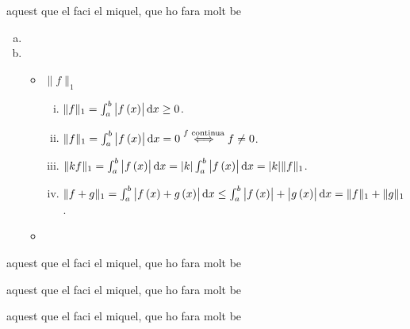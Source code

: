\begin{eje}
aquest que el faci el miquel, que ho fara molt be
\end{eje}

\begin{eje}
    \begin{enumerate}[(a)]
        \item[]
        \item
            \begin{itemize}
                \item $\| f \|_1$
                    \begin{enumerate}[i)]
                        \item $\| f \|_1 =  \int_a^b \left| f \lp x \rp \right| \dif x \geq 0$.
                        \item $\| f \|_1 =  \int_a^b \left| f \lp x \rp \right| \dif x = 0 \stackrel{f \text{ continua}}{\iff} f\neq 0$.
                        \item $\| kf \|_1 =  \int_a^b \left| f \lp x \rp \right| \dif x = | k | \int_a^b \left| f \lp x \rp \right| \dif x = | k | \|f \|_1$.
                        \item $\| f+g \|_1 =  \int_a^b \left| f \lp x \rp +g \lp x \rp \right| \dif x \leq \int_a^b \left| f\lp x \rp \right| + \left| g \lp x \rp \right| \dif x = \| f \| _1 + \| g \|_ 1 $.
                    \end{enumerate}
                \item 
            \end{itemize}
        \end{enumerate}
\end{eje}

\begin{eje}
aquest que el faci el miquel, que ho fara molt be
\end{eje}

\begin{eje}
aquest que el faci el miquel, que ho fara molt be
\end{eje}

\begin{eje}
aquest que el faci el miquel, que ho fara molt be
\end{eje}

